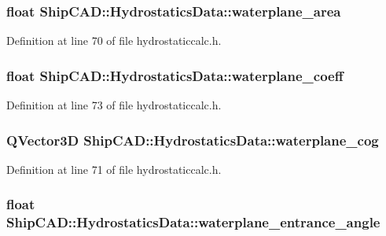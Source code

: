 \hypertarget{structShipCAD_1_1HydrostaticsData_a5f3432f4d790bbb9c4d75502cb15b7f0}{
\subsubsection[{waterplane\-\_\-area}]{\setlength{\rightskip}{0pt plus 5cm}float Ship\-C\-A\-D\-::\-Hydrostatics\-Data\-::waterplane\-\_\-area}}\label{structShipCAD_1_1HydrostaticsData_a5f3432f4d790bbb9c4d75502cb15b7f0}


Definition at line 70 of file hydrostaticcalc.\-h.

\hypertarget{structShipCAD_1_1HydrostaticsData_a4d5eb630367999a611b95dd0d2c2242c}{
\subsubsection[{waterplane\-\_\-coeff}]{\setlength{\rightskip}{0pt plus 5cm}float Ship\-C\-A\-D\-::\-Hydrostatics\-Data\-::waterplane\-\_\-coeff}}\label{structShipCAD_1_1HydrostaticsData_a4d5eb630367999a611b95dd0d2c2242c}


Definition at line 73 of file hydrostaticcalc.\-h.

\hypertarget{structShipCAD_1_1HydrostaticsData_ac100876d13ae75147585c5c0f80801fe}{
\subsubsection[{waterplane\-\_\-cog}]{\setlength{\rightskip}{0pt plus 5cm}Q\-Vector3\-D Ship\-C\-A\-D\-::\-Hydrostatics\-Data\-::waterplane\-\_\-cog}}\label{structShipCAD_1_1HydrostaticsData_ac100876d13ae75147585c5c0f80801fe}


Definition at line 71 of file hydrostaticcalc.\-h.

\hypertarget{structShipCAD_1_1HydrostaticsData_a3e22cf4f03f02a3c0d14e7f66610fd80}{
\subsubsection[{waterplane\-\_\-entrance\-\_\-angle}]{\setlength{\rightskip}{0pt plus 5cm}float Ship\-C\-A\-D\-::\-Hydrostatics\-Data\-::waterplane\-\_\-entrance\-\_\-angle}}\label{structShipCAD_1_1HydrostaticsData_a3e22cf4f03f02a3c0d14e7f66610fd80}


